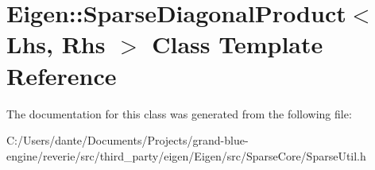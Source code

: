 \hypertarget{class_eigen_1_1_sparse_diagonal_product}{}\section{Eigen\+::Sparse\+Diagonal\+Product$<$ Lhs, Rhs $>$ Class Template Reference}
\label{class_eigen_1_1_sparse_diagonal_product}


The documentation for this class was generated from the following file\+:\begin{DoxyCompactItemize}
\item 
C\+:/\+Users/dante/\+Documents/\+Projects/grand-\/blue-\/engine/reverie/src/third\+\_\+party/eigen/\+Eigen/src/\+Sparse\+Core/Sparse\+Util.\+h\end{DoxyCompactItemize}

